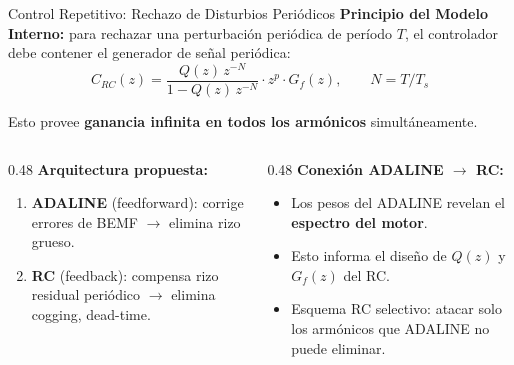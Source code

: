 \begin{frame}{Control Repetitivo: Rechazo de Disturbios Periódicos}
    \textbf{Principio del Modelo Interno:} para rechazar una perturbación periódica de período $T$, el controlador debe contener el generador de señal periódica:
    \begin{equation}
        C_{RC}(z) = \frac{Q(z)\,z^{-N}}{1 - Q(z)\,z^{-N}} \cdot z^p \cdot G_f(z), \qquad N = T/T_s
    \end{equation}
    
    Esto provee \textbf{ganancia infinita en todos los armónicos} simultáneamente.
    
    \vspace{0.3cm}
    
    \begin{columns}[T]
    \begin{column}{0.48\textwidth}
        \textbf{Arquitectura propuesta:}
        \begin{enumerate}
            \item \textbf{ADALINE} (feedforward): corrige errores de BEMF $\rightarrow$ elimina rizo grueso.
            \item \textbf{RC} (feedback): compensa rizo residual periódico $\rightarrow$ elimina cogging, dead-time.
        \end{enumerate}
    \end{column}
    \begin{column}{0.48\textwidth}
        \textbf{Conexión ADALINE $\rightarrow$ RC:}
        \begin{itemize}
            \item Los pesos del ADALINE revelan el \textbf{espectro del motor}.
            \item Esto informa el diseño de $Q(z)$ y $G_f(z)$ del RC.
            \item Esquema RC selectivo: atacar solo los armónicos que ADALINE no puede eliminar.
        \end{itemize}
    \end{column}
    \end{columns}
\end{frame}


